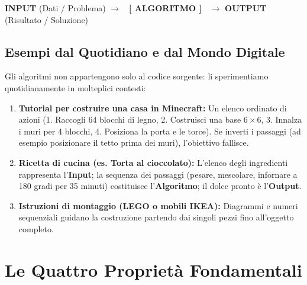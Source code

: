 \vspace{1em}
\begin{center}
\begin{tcolorbox}[colback=white,colframe=PiazzaGray!40,width=0.88\textwidth,arc=2mm,halign=center]
\textbf{INPUT} (Dati / Problema) $\longrightarrow$ \colorbox{PiazzaPrimary!10}{\textbf{~[ ALGORITMO ]~}} $\longrightarrow$ \textbf{OUTPUT} (Risultato / Soluzione)
\end{tcolorbox}
\end{center}

\subsection{Esempi dal Quotidiano e dal Mondo Digitale}

Gli algoritmi non appartengono solo al codice sorgente: li sperimentiamo quotidianamente in molteplici contesti:

\begin{esempio}
\begin{enumerate}
  \item \textbf{Tutorial per costruire una casa in Minecraft:} Un elenco ordinato di azioni (1. Raccogli 64 blocchi di legno, 2. Costruisci una base $6 \times 6$, 3. Innalza i muri per 4 blocchi, 4. Posiziona la porta e le torce). Se inverti i passaggi (ad esempio posizionare il tetto prima dei muri), l'obiettivo fallisce.
  \item \textbf{Ricetta di cucina (es. Torta al cioccolato):} L'elenco degli ingredienti rappresenta l'\textbf{Input}; la sequenza dei passaggi (pesare, mescolare, infornare a 180 gradi per 35 minuti) costituisce l'\textbf{Algoritmo}; il dolce pronto è l'\textbf{Output}.
  \item \textbf{Istruzioni di montaggio (LEGO o mobili IKEA):} Diagrammi e numeri sequenziali guidano la costruzione partendo dai singoli pezzi fino all'oggetto completo.
\end{enumerate}
\end{esempio}

\section{Le Quattro Proprietà Fondamentali}


